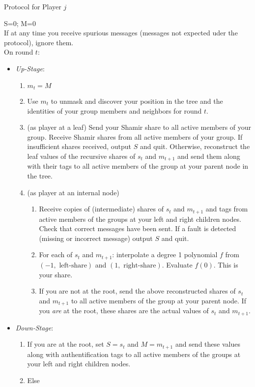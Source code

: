 \documentclass[12pt]{article}
\theoremstyle{definition}
\newcommand{\upStage}{\emph{Up-Stage}\xspace}
\newcommand{\downStage}{\emph{Down-Stage}\xspace}
\begin{document}
\begin{algorithm}
{\small 
\caption{Protocol for Player $j$} \label{alg:mofnPlayer} 
S=0; M=0 \\
If at any time you receive spurious messages (messages not expected uder the 
protocol), ignore them. \\
On round $t$:
\begin{itemize}
\item[] \upStage:
\begin{enumerate}
\item $m_t = M$
\item Use $m_t$ to unmask and discover your position in the 
tree and the identities of your group members and neighbors for round $t$.
\item (as player at a leaf)
Send your Shamir share to all active members of your group. Receive Shamir 
shares from all active members of your group. If insufficient shares received, 
output $S$ and quit. Otherwise, reconstruct the leaf values of the recursive  
shares of $s_t$ and $m_{t+1}$  and send them along with their tags to all 
active members of the group at your 
parent node in the tree.
\item (as player at an internal node) 
\begin{enumerate}
\item Receive copies of (intermediate) shares of $s_t$ and $m_{t+1}$ 
and tags from active members of the groups at your left and right children 
nodes. Check that correct messages have been sent.
If a fault is detected (missing or incorrect message) output $S$ and quit.
\item For each of $s_t$ and $m_{t+1}$: interpolate a degree 1 polynomial $f$ 
from $(-1, \mbox{ left-share})$ and $(1, \mbox{ right-share})$. 
Evaluate $f(0)$. This is your share.
\item If you are not at the root, send the above reconstructed shares of $s_t$ 
and $m_{t+1}$ to all active members of the group at your parent node. If you 
\emph{are} at the root, these shares are the actual values of $s_t$ and 
$m_{t+1}$.
\end{enumerate}
\end{enumerate}
\item[] \downStage:
\begin{enumerate}
\item If you are at the root, set $S=s_t$ and $M=m_{t+1}$ and send these 
values along with authentification tags to all active members of the groups at
your left and right children nodes.
\item Else

\end{enumerate}
\end{itemize}}
\end{algorithm}
\end{document}
